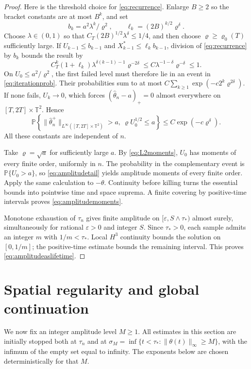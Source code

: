 \documentclass[11pt]{amsart}
\theoremstyle{remark}
\numberwithin{equation}{section}
\newcommand{\T}{\mathbb T}
\newcommand{\PP}{\mathbb P}
\newcommand{\norm}[1]{\lVert#1\rVert}
\begin{document}
\begin{proof}
Here is the threshold choice for \eqref{eq:recurrence}. Enlarge $B\geq2$
so the bracket constants are at most $B^k$, and set
\[
 b_k=a^2\lambda^k/\varrho^2,\qquad
 \ell_k=(2B)^{k/2}\varrho^\delta.
\]
Choose $\lambda\in(0,1)$ so that
$C_T(2B)^{1/2}\lambda^\delta\leq1/4$, and then choose
$\varrho\geq\varrho_0(T)$ sufficiently large. If
$U_{k-1}\leq b_{k-1}$ and $X_{k-1}^*\leq\ell_kb_{k-1}$, division of
\eqref{eq:recurrence} by $b_k$ bounds the result by
\[
 C_T^k(1+\ell_k)\lambda^{\delta(k-1)-1}\varrho^{-2\delta}
 \leq C\lambda^{-1-\delta}\varrho^{-\delta}\leq1.
\]
On $U_0\leq a^2/\varrho^2$, the first failed level must therefore lie in
an event in \eqref{eq:iterationprob}. Their probabilities sum to at most
$C\sum_{k\geq1}\exp(-c2^k\varrho^{2\delta})$. If none fails,
$U_k\to0$, which forces $(\widehat\theta_n-a)_+=0$ almost everywhere on
$[T,2T]\times\T^2$. Hence
\begin{equation}\label{eq:amplitudetail}
 \PP\left\{\norm{\widehat\theta_n^+}_{L^\infty([T,2T]\times\T^2)}>a,
                 \ \varrho U_0^{1/2}\leq a\right\}
 \leq C\exp(-c\varrho^\delta).
\end{equation}
All these constants are independent of $n$.

Take $\varrho=\sqrt a$ for sufficiently large $a$.
By \eqref{eq:L2moments}, $U_0$ has moments of every finite order, uniformly
in $n$. The probability in the complementary event is
$\PP\{U_0>a\}$, so \eqref{eq:amplitudetail} yields amplitude moments of
every finite order. Apply the same calculation to $-\theta$.
Continuity before killing turns the essential bounds into pointwise time and
space suprema. A finite covering by positive-time intervals proves
\eqref{eq:amplitudemoments}.

Monotone exhaustion of $\tau_n$ gives finite amplitude on
$[\varepsilon,S\wedge\tau_*)$ almost surely, simultaneously for rational
$\varepsilon>0$ and integer $S$. Since $\tau_*>0$, each sample admits an
integer $m$ with $1/m<\tau_*$. Local $H^3$ continuity bounds the solution
on $[0,1/m]$; the positive-time estimate bounds the remaining interval.
This proves \eqref{eq:amplitudeaslifetime}.
\end{proof}

\section{Spatial regularity and global continuation}\label{sec:regularity}

We now fix an integer amplitude level $M\geq1$. All estimates in this section
are initially stopped both at $\tau_n$ and at
$\sigma_M=\inf\{t<\tau_*:\norm{\theta(t)}_\infty\geq M\}$,
with the infimum of the empty set equal to infinity.
The exponents below are chosen deterministically for that $M$.
\end{document}
